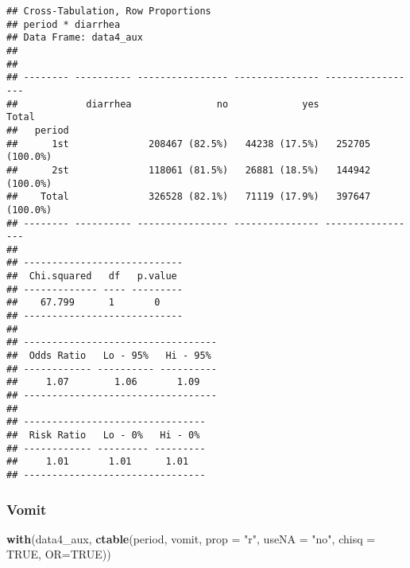 \documentclass[
]{article}
\newenvironment{Shaded}{\begin{snugshade}}{\end{snugshade}}
\newcommand{\DataTypeTok}[1]{\textcolor[rgb]{0.13,0.29,0.53}{#1}}
\newcommand{\KeywordTok}[1]{\textcolor[rgb]{0.13,0.29,0.53}{\textbf{#1}}}
\newcommand{\NormalTok}[1]{#1}
\newcommand{\OtherTok}[1]{\textcolor[rgb]{0.56,0.35,0.01}{#1}}
\newcommand{\StringTok}[1]{\textcolor[rgb]{0.31,0.60,0.02}{#1}}
\begin{document}
\begin{verbatim}
## Cross-Tabulation, Row Proportions  
## period * diarrhea  
## Data Frame: data4_aux  
## 
## 
## -------- ---------- ---------------- --------------- -----------------
##            diarrhea               no             yes             Total
##   period                                                              
##      1st              208467 (82.5%)   44238 (17.5%)   252705 (100.0%)
##      2st              118061 (81.5%)   26881 (18.5%)   144942 (100.0%)
##    Total              326528 (82.1%)   71119 (17.9%)   397647 (100.0%)
## -------- ---------- ---------------- --------------- -----------------
## 
## ----------------------------
##  Chi.squared   df   p.value 
## ------------- ---- ---------
##    67.799      1       0    
## ----------------------------
## 
## ----------------------------------
##  Odds Ratio   Lo - 95%   Hi - 95% 
## ------------ ---------- ----------
##     1.07        1.06       1.09   
## ----------------------------------
## 
## --------------------------------
##  Risk Ratio   Lo - 0%   Hi - 0% 
## ------------ --------- ---------
##     1.01       1.01      1.01   
## --------------------------------
\end{verbatim}

\hypertarget{vomit-1}{%
\subsubsection{Vomit}\label{vomit-1}}

\begin{Shaded}
\begin{Highlighting}[]
\KeywordTok{with}\NormalTok{(data4_aux, }\KeywordTok{ctable}\NormalTok{(period, vomit, }\DataTypeTok{prop =} \StringTok{"r"}\NormalTok{, }\DataTypeTok{useNA =} \StringTok{"no"}\NormalTok{, }\DataTypeTok{chisq =} \OtherTok{TRUE}\NormalTok{, }\DataTypeTok{OR=}\OtherTok{TRUE}\NormalTok{))}
\end{Highlighting}
\end{Shaded}
\end{document}
